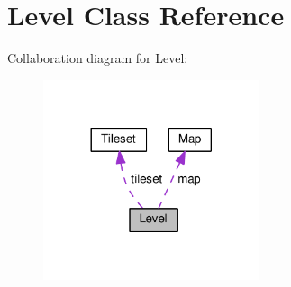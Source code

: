 \hypertarget{classLevel}{}\section{Level Class Reference}
\label{classLevel}


Collaboration diagram for Level\+:
\nopagebreak
\begin{figure}[H]
\begin{center}
\leavevmode
\includegraphics[width=180pt]{classLevel__coll__graph}
\end{center}
\end{figure}
